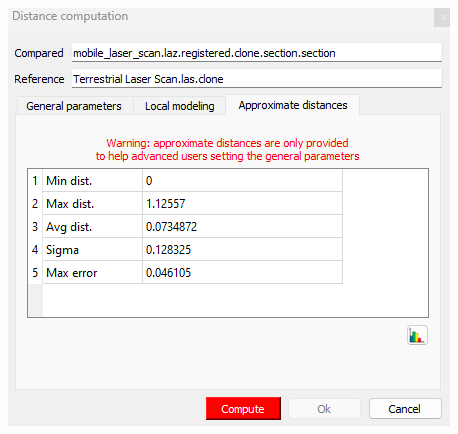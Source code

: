 \documentclass[man]{apa7}
\begin{document}
\begin{minipage}{\linewidth}
  \includegraphics[height=\textheight/4 ,width=\textwidth/2]{figures/exampleSubsectioning2.png}
  \label{fig:subsectionResults}
\end{minipage}
\end{document}
